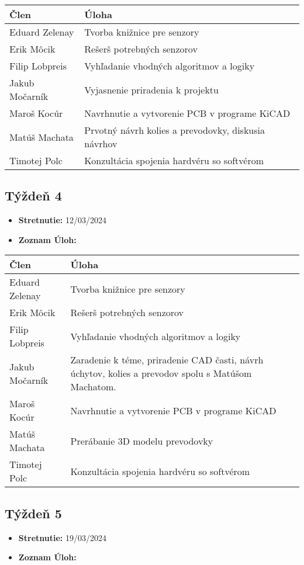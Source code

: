 \begin{tabular}{|l|l|}
    \hline
    \textbf{Člen} & \textbf{Úloha} \\
    \hline
    Eduard Zelenay & Tvorba knižnice pre senzory \\
    Erik Môcik & Rešerš potrebných senzorov \\
    Filip Lobpreis & Vyhľadanie vhodných algoritmov a logiky \\
    Jakub Močarník & Vyjasnenie priradenia k projektu \\
    Maroš Kocúr & Navrhnutie a vytvorenie PCB v programe KiCAD \\
    Matúš Machata & Prvotný návrh kolies a prevodovky, diskusia návrhov \\
    Timotej Polc & Konzultácia spojenia hardvéru so softvérom \\
    \hline
\end{tabular}
\subsection{Týždeň 4}
\begin{itemize}
    \item \textbf{Stretnutie:} 12/03/2024
    \item \textbf{Zoznam Úloh:}
\end{itemize}

\begin{tabular}{|l|l|}
    \hline
    \textbf{Člen} & \textbf{Úloha} \\
    \hline
    Eduard Zelenay & Tvorba knižnice pre senzory \\
    Erik Môcik & Rešerš potrebných senzorov \\
    Filip Lobpreis & Vyhľadanie vhodných algoritmov a logiky \\
    Jakub Močarník & Zaradenie k téme, priradenie CAD časti, návrh úchytov, kolies a prevodov spolu s Matúšom Machatom. \\
    Maroš Kocúr & Navrhnutie a vytvorenie PCB v programe KiCAD \\
    Matúš Machata & Prerábanie 3D modelu prevodovky \\
    Timotej Polc & Konzultácia spojenia hardvéru so softvérom \\
    \hline
\end{tabular}
\subsection{Týždeň 5}
\begin{itemize}
    \item \textbf{Stretnutie:} 19/03/2024
    \item \textbf{Zoznam Úloh:}
\end{itemize}

